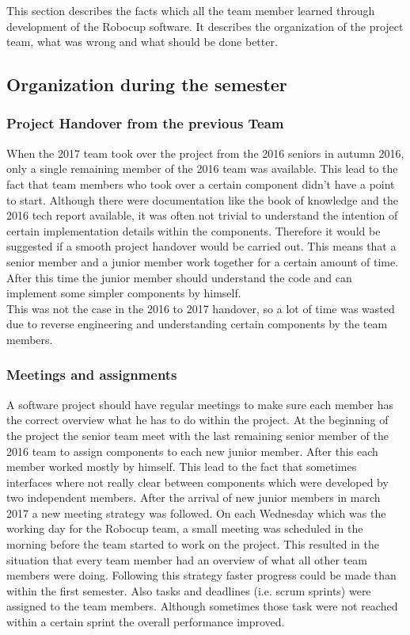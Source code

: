 This section describes the facts which all the team member learned through development of the Robocup software. It describes the organization of the 
project team, what was wrong and what should be done better.

\subsection{Organization during the semester}
 
\subsubsection{Project Handover from the previous Team}

When the 2017 team took over the project from the 2016 seniors in autumn 2016, only a single remaining member of the 2016 team was available. This lead to the fact that team members who took over a certain component didn't have a point to start. Although there were documentation like the book of knowledge \cite{BOK} and the 2016 tech report available, it was often not trivial to understand the intention of certain implementation details within the components. Therefore it would be suggested if a smooth project handover would be carried out. This means that a senior member and a junior member work together for a certain amount of time. After this time the junior member should understand the code and can implement some simpler components by himself. \\

This was not the case in the 2016 to 2017 handover, so a lot of time was wasted due to reverse engineering and understanding certain components by the team members. 
 
\subsubsection{Meetings and assignments}
 
A software project should have regular meetings to make sure each member has the correct overview what he has to do within the project. At the beginning of the project the senior team meet with the last remaining senior member of the 2016 team to assign components to each new junior member. After this each member worked mostly by himself. This lead to the fact that sometimes interfaces where not really clear between components which were developed by two independent members. After the arrival of new junior members in march 2017 a new meeting strategy was followed. On each Wednesday which was the working day for the Robocup team, a small meeting was scheduled in the morning before the team started to work on the project. This resulted in the situation that every team member had an overview of what all other team members were doing. Following this strategy faster progress could be made than within the first semester. Also tasks and deadlines (i.e. scrum sprints) were assigned to the team members. Although sometimes those task were not reached within a certain sprint the overall performance improved.


